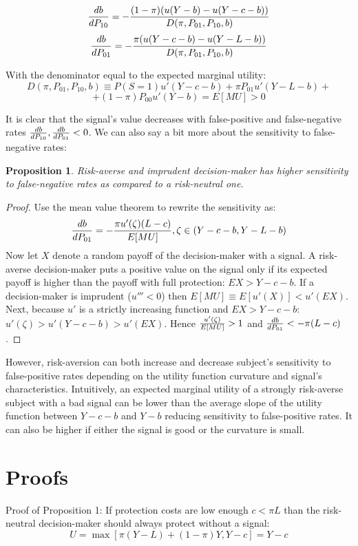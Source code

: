 \documentclass[12pt,a4paper]{article}
\newtheorem{theorem}{Proposition}
\begin{document}
$${db\over dP_{10}}=-{(1-\pi)(u(Y-b)-u(Y-c-b))\over D(\pi, P_{01}, P_{10}, b)}$$
$${db\over dP_{01}}=-{\pi(u(Y-c-b)-u(Y-L-b))\over D(\pi, P_{01}, P_{10}, b)}$$

With the denominator equal to the expected marginal utility:
$$D(\pi, P_{01}, P_{10}, b)\equiv P(S=1)u'(Y-c-b)+\pi P_{01}u'(Y-L-b)+$$
$$+(1-\pi)P_{00}u'(Y-b)=E[MU]>0$$

It is clear that the signal's value decreases with false-positive and false-negative rates ${db\over dP_{10}},{db\over dP_{01}}<0$. We can also say a bit more about the sensitivity to false-negative rates:
\begin{theorem}
Risk-averse and imprudent decision-maker has higher sensitivity to false-negative rates as compared to a risk-neutral one.
\end{theorem} 
\begin{proof}
Use the mean value theorem to rewrite the sensitivity as:
$${db\over dP_{01}}=-{\pi u'(\zeta)(L-c)\over E[MU]},\zeta \in \left(Y-c-b, Y-L-b\right)$$
Now let $X$ denote a random payoff of the decision-maker with a signal. A risk-averse decision-maker puts a positive value on the signal only if its expected payoff is higher than the payoff with full protection: $EX>Y-c-b$. If a decision-maker is imprudent ($u'''<0$) then $E[MU]\equiv E[u'(X)]<u'(EX)$. Next, because $u'$ is a strictly increasing function and $EX>Y-c-b$: $u'(\zeta)>u'(Y-c-b)>u'(EX)$. Hence ${u'(\zeta)\over E[MU]}>1$ and ${db\over dP_{01}}<-\pi(L-c)$. 
\end{proof}


However, risk-aversion can both increase and decrease subject's sensitivity to false-positive rates depending on the utility function curvature and signal's characteristics. Intuitively, an expected marginal utility of a strongly risk-averse subject with a bad signal can be lower than the average slope of the utility function between $Y-c-b$ and $Y-b$ reducing sensitivity to false-positive rates. It can also be higher if either the signal is good or the curvature is small. 

\newpage
\singlespacing
\small




 
\appendix
\newpage
\section{Proofs}

Proof of Proposition 1: If protection costs are low enough $c<\pi L$ than the risk-neutral decision-maker should always protect without a signal:
$$U=\max[\pi(Y-L)+(1-\pi)Y,Y-c]=Y-c$$
\end{document}
